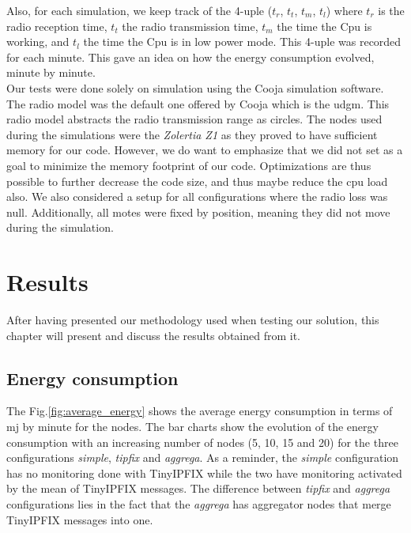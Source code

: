Also, for each simulation, we keep track of the 4-uple ($t_r$, $t_t$, $t_m$, $t_l$) where $t_r$ is the radio reception time, $t_t$ the radio transmission time, $t_m$ the time the Cpu is working, and $t_l$ the time the Cpu is in low power mode. This 4-uple was recorded for each minute. This gave an idea on how the energy consumption evolved, minute by minute.\\

Our tests were done solely on simulation using the Cooja simulation software. The radio model was the default one offered by Cooja which is the \acrfull{udgm}. This radio model abstracts the radio transmission range as circles. The nodes used during the simulations were the \textit{Zolertia Z1} as they proved to have sufficient memory for our code. However, we do want to emphasize that we did not set as a goal to minimize the memory footprint of our code. Optimizations are thus possible to further decrease the code size, and thus maybe reduce the cpu load also. We also considered a setup for all configurations where the radio loss was null. Additionally, all motes were fixed by position, meaning they did not move during the simulation.

\chapter{Results}

After having presented our methodology used when testing our solution, this chapter will present and discuss the results obtained from it.

\section{Energy consumption}

The Fig.\ref{fig:average_energy} shows the average energy consumption in terms of \acrfull{mj} by minute for the nodes. The bar charts show the evolution of the energy consumption with an increasing number of nodes (5, 10, 15 and 20) for the three configurations \textit{simple}, \textit{tipfix} and \textit{aggrega}. As a reminder, the \textit{simple} configuration has no monitoring done with TinyIPFIX while the two have monitoring activated by the mean of TinyIPFIX messages. The difference between \textit{tipfix} and \textit{aggrega} configurations lies in the fact that the \textit{aggrega} has aggregator nodes that merge TinyIPFIX messages into one. \\


